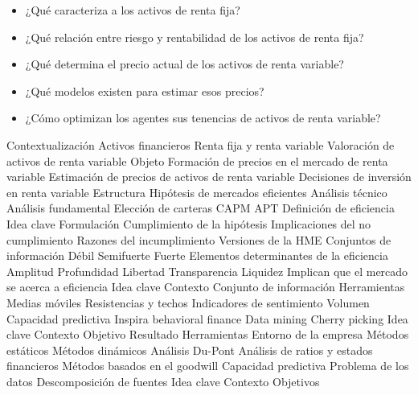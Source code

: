 \documentclass{nuevotema}
\begin{document}
\begin{itemize}
    \item ¿Qué caracteriza a los activos de renta fija?
    \item ¿Qué relación entre riesgo y rentabilidad de los activos de renta fija?
    \item ¿Qué determina el precio actual de los activos de renta variable?
    \item ¿Qué modelos existen para estimar esos precios?
    \item ¿Cómo optimizan los agentes sus tenencias de activos de renta variable?
\end{itemize}

\esquemacorto

\begin{esquema}[enumerate]
	\1[] 
		\2 Contextualización
			\3 Activos financieros
			\3 Renta fija y renta variable
			\3 Valoración de activos de renta variable
		\2 Objeto
			\3 Formación de precios en el mercado de renta variable
			\3 Estimación de precios de activos de renta variable
			\3 Decisiones de inversión en renta variable
		\2 Estructura
			\3 Hipótesis de mercados eficientes
			\3 Análisis técnico
			\3 Análisis fundamental
			\3 Elección de carteras
			\3 CAPM
			\3 APT
	\1 
		\2 Definición de eficiencia
			\3 Idea clave
			\3 Formulación
		\2 Cumplimiento de la hipótesis
			\3 Implicaciones del no cumplimiento
			\3 Razones del incumplimiento
		\2 Versiones de la HME
			\3 Conjuntos de información
			\3 Débil
			\3 Semifuerte
			\3 Fuerte
		\2 Elementos determinantes de la eficiencia
			\3 Amplitud
			\3 Profundidad
			\3 Libertad
			\3 Transparencia
			\3 Liquidez
			\3[$\then$] Implican que el mercado se acerca a eficiencia
	\1 
		\2 Idea clave
			\3 Contexto
			\3 Conjunto de información
		\2 Herramientas
			\3 Medias móviles
			\3 Resistencias y techos
			\3 Indicadores de sentimiento
			\3 Volumen
		\2 Capacidad predictiva
			\3 Inspira behavioral finance
			\3 Data mining
			\3 Cherry picking
	\1 
		\2 Idea clave
			\3 Contexto
			\3 Objetivo
			\3 Resultado
		\2 Herramientas
			\3 Entorno de la empresa
			\3 Métodos estáticos
			\3 Métodos dinámicos
			\3 Análisis Du-Pont
			\3 Análisis de ratios y estados financieros
			\3 Métodos basados en el goodwill
		\2 Capacidad predictiva
			\3 Problema de los datos
			\3 Descomposición de fuentes
	\1 
		\2 Idea clave
			\3 Contexto
			\3 Objetivos

\end{esquema}
\end{document}
